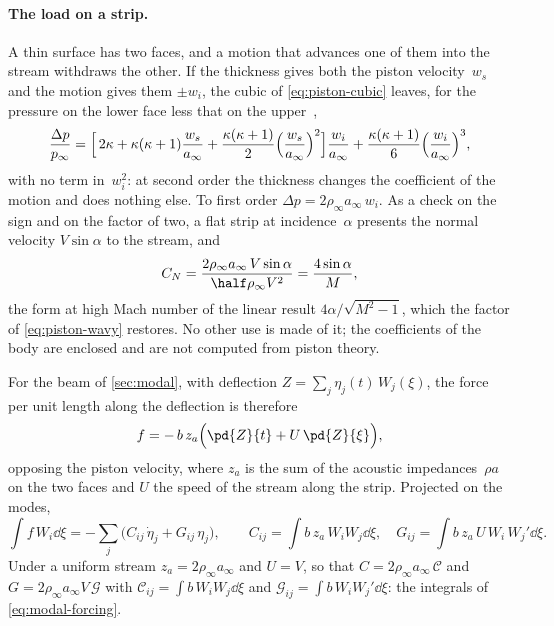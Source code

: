 \paragraph{The load on a strip.}
A thin surface has two faces, and a motion that advances one of them into
the stream withdraws the other. If the thickness gives both the piston
velocity~$w_s$ and the motion gives them $\pm w_i$, the cubic of
\cref{eq:piston-cubic} leaves, for the pressure on the lower face less that
on the upper~\cite[Eq.~(8)]{lighthill1953oscillating},
\begin{equation}\label{eq:piston-load}
  \frac{\Delta p}{p_\infty}
  = \Bigl[\,2\kappa + \kappa(\kappa+1)\frac{w_s}{a_\infty}
      + \frac{\kappa(\kappa+1)}{2}\Bigl(\frac{w_s}{a_\infty}\Bigr)^{2}\Bigr]
    \frac{w_i}{a_\infty}
    + \frac{\kappa(\kappa+1)}{6}\Bigl(\frac{w_i}{a_\infty}\Bigr)^{3} ,
\end{equation}
with no term in~$w_i^2$: at second order the thickness changes the
coefficient of the motion and does nothing else. To first order
$\Delta p = 2\rho_\infty a_\infty\,w_i$. As a check on the sign and on the
factor of two, a flat strip at incidence~$\alpha$ presents the normal
velocity $V\sin\alpha$ to the stream, and
\begin{equation}\label{eq:piston-flat}
  C_N = \frac{2\rho_\infty a_\infty\,V\sin\alpha}{\half\rho_\infty V^2}
      = \frac{4\sin\alpha}{M} ,
\end{equation}
the form at high Mach number of the linear result
$4\alpha/\sqrt{M^2-1}$, which the factor of \cref{eq:piston-wavy} restores.
No other use is made of it; the coefficients of the body are enclosed and
are not computed from piston theory.

For the beam of \cref{sec:modal}, with deflection
$Z = \sum_j\eta_j(t)\,W_j(\xi)$, the force per unit length along the
deflection is therefore
\begin{equation}\label{eq:piston-strip}
  f = -\,b\,z_a\Bigl(\pd{Z}{t} + U\,\pd{Z}{\xi}\Bigr) ,
\end{equation}
opposing the piston velocity, where $z_a$ is the sum of the acoustic
impedances~$\rho a$ on the two faces and $U$ the speed of the stream along
the strip. Projected on the modes,
\begin{equation}\label{eq:aero-matrices}
  \int f\,W_i\dd\xi
  = -\sum_j\bigl(C_{ij}\,\dot\eta_j + G_{ij}\,\eta_j\bigr),
  \qquad
  C_{ij} = \int b\,z_a\,W_iW_j\dd\xi ,
  \quad
  G_{ij} = \int b\,z_a\,U\,W_i\,W_j'\dd\xi .
\end{equation}
Under a uniform stream $z_a = 2\rho_\infty a_\infty$ and $U = V$, so that
$C = 2\rho_\infty a_\infty\,\mathcal{C}$ and
$G = 2\rho_\infty a_\infty V\,\mathcal{G}$ with
$\mathcal{C}_{ij} = \int b\,W_iW_j\dd\xi$ and
$\mathcal{G}_{ij} = \int b\,W_iW_j'\dd\xi$: the integrals of
\cref{eq:modal-forcing}.


